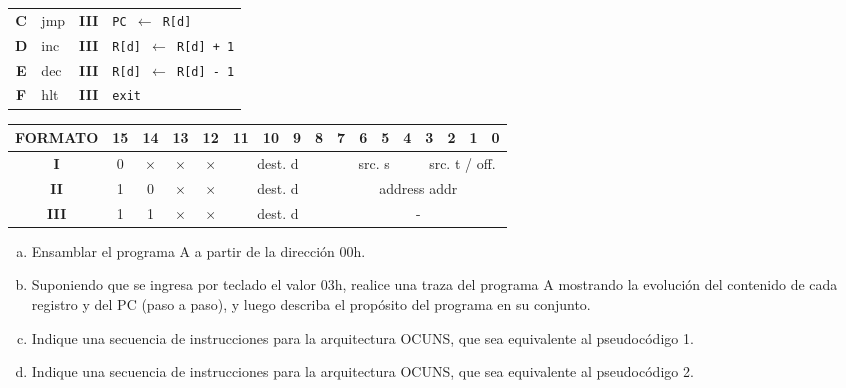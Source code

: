 \documentclass[12pt,a4paper]{article}
\begin{document}
\begin{small}
\begin{minipage}{.6\textwidth}
\begin{tabular}{|c|l|c|l|}
			\textbf{C} & \textsf{jmp}   & \textbf{III} & \texttt{PC $\leftarrow$ R[d]} \\
			\textbf{D} & \textsf{inc}   & \textbf{III} & \texttt{R[d] $\leftarrow$ R[d] + 1} \\
			\textbf{E} & \textsf{dec}   & \textbf{III} & \texttt{R[d] $\leftarrow$ R[d] - 1} \\
			\textbf{F} & \textsf{hlt}   & \textbf{III} & \texttt{exit} \\ \hline
		\end{tabular}	
	\end{minipage}
	\begin{center}
		\begin{tabular}{*{17}{c}}
			\textsf{FORMATO} & 15 & 14 & 13 & 12 & 11 & 10 & 9 & 8 & 7 & 6 & 5 & 4 & 3 & 2 & 1 & 0 \\ \hline
			\multicolumn{1}{|c|}{\textbf{I}} & 0 & $\times$ & $\times$ & $\times$ &
			\multicolumn{4}{|c|}{\textsf{dest. d}} &
			\multicolumn{4}{|c|}{\textsf{src. s}} &
			\multicolumn{4}{|c|}{\textsf{src. t / off.}} \\ \hline
			\multicolumn{1}{|c|}{\textbf{II}} & 1 & 0 & $\times$ & $\times$ &
			\multicolumn{4}{|c|}{\textsf{dest. d}} &
			\multicolumn{8}{|c|}{\textsf{address addr}} \\ \hline
			\multicolumn{1}{|c|}{\textbf{III}} & 1 & 1 & $\times$ & $\times$ &
			\multicolumn{4}{|c|}{\textsf{dest. d}} &
			\multicolumn{8}{|c|}{\textsf{-}} \\ \hline
		\end{tabular}
	\end{center}		
\end{small}
\begin{small}
\begin{enumerate}[a)]
	\item Ensamblar el programa A a partir de la dirección 00h.
	\item Suponiendo que se ingresa por teclado el valor 03h, realice una traza del programa A mostrando la evolución del contenido de cada registro y del PC (paso a paso), y luego describa el propósito del programa en su conjunto.
	\item Indique una secuencia de instrucciones para la arquitectura OCUNS, que sea equivalente al pseudocódigo 1.
	\item Indique una secuencia de instrucciones para la arquitectura OCUNS, que sea equivalente al pseudocódigo 2.	
\end{enumerate}
\end{small}
\end{document}
